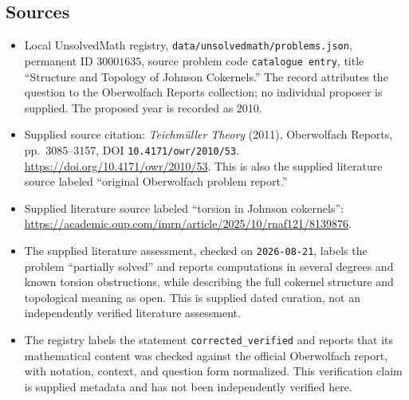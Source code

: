 \documentclass[11pt]{article}
\begin{document}
\subsection{Sources}
\begin{itemize}
\item Local UnsolvedMath registry, \texttt{data/unsolvedmath/problems.json}, permanent ID \(30001635\), source problem code \texttt{catalogue entry}, title ``Structure and Topology of Johnson Cokernels.'' The record attributes the question to the Oberwolfach Reports collection; no individual proposer is supplied. The proposed year is recorded as 2010.
\item Supplied source citation: \emph{Teichmüller Theory} (2011), Oberwolfach Reports, pp.\ 3085--3157, DOI \texttt{10.4171/owr/2010/53}. \url{https://doi.org/10.4171/owr/2010/53}. This is also the supplied literature source labeled ``original Oberwolfach problem report.''
\item Supplied literature source labeled ``torsion in Johnson cokernels'': \url{https://academic.oup.com/imrn/article/2025/10/rnaf121/8139876}.
\item The supplied literature assessment, checked on \texttt{2026-08-21}, labels the problem ``partially solved'' and reports computations in several degrees and known torsion obstructions, while describing the full cokernel structure and topological meaning as open. This is supplied dated curation, not an independently verified literature assessment.
\item The registry labels the statement \texttt{corrected\_verified} and reports that its mathematical content was checked against the official Oberwolfach report, with notation, context, and question form normalized. This verification claim is supplied metadata and has not been independently verified here.
\end{itemize}
\end{document}
